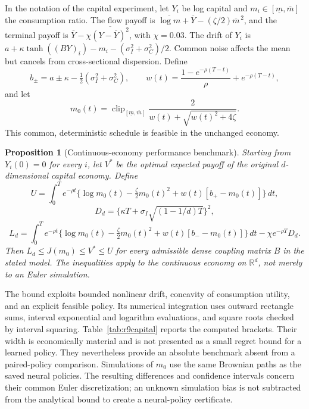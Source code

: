 \documentclass[ecta,nameyear,draft]{econsocart}
\newtheorem{proposition}[theorem]{Proposition}
\theoremstyle{definition}
\theoremstyle{remark}
\begin{document}
In the notation of the capital experiment, let $Y_i$ be log capital and $m_i\in[\underline m,\overline m]$ the consumption ratio. The flow payoff is $\overline{\log m}+\overline Y-(\zeta/2)\overline m^{\,2}$, and the terminal payoff is $\overline Y-\chi\overline{(Y-\overline Y)^2}$, with $\chi=0.03$. The drift of $Y_i$ is $a+\kappa\tanh((BY)_i)-m_i-(\sigma_I^2+\sigma_C^2)/2$. Common noise affects the mean but cancels from cross-sectional dispersion. Define
\[
 b_\pm=a\pm\kappa-\tfrac12(\sigma_I^2+\sigma_C^2),\qquad
 w(t)=\frac{1-e^{-\rho(T-t)}}{\rho}+e^{-\rho(T-t)},
\]
and let
\[
 m_0(t)=\operatorname{clip}_{[\underline m,\overline m]}
 \frac{2}{w(t)+\sqrt{w(t)^2+4\zeta}}.
\]
This common, deterministic schedule is feasible in the unchanged economy.

\begin{proposition}[Continuous-economy performance benchmark]\label{prop:r9capital}
Starting from $Y_i(0)=0$ for every $i$, let $V^*$ be the optimal expected payoff of the original $d$-dimensional capital economy. Define
\[
 U=\int_0^T e^{-\rho t}\{\log m_0(t)-\tfrac{\zeta}{2}m_0(t)^2+w(t)[b_+-m_0(t)]\}\,dt,
\]
\[
 D_d=\{\kappa T+\sigma_I\sqrt{(1-1/d)T}\}^{2},
\]
\[
 L_d=\int_0^T e^{-\rho t}\{\log m_0(t)-\tfrac{\zeta}{2}m_0(t)^2+w(t)[b_--m_0(t)]\}\,dt
 -\chi e^{-\rho T}D_d.
\]
Then $L_d\leq J(m_0)\leq V^*\leq U$ for every admissible dense coupling matrix $B$ in the stated model. The inequalities apply to the continuous economy on $\mathbb R^d$, not merely to an Euler simulation.
\end{proposition}

The bound exploits bounded nonlinear drift, concavity of consumption utility, and an explicit feasible policy. Its numerical integration uses outward rectangle sums, interval exponential and logarithm evaluations, and square roots checked by interval squaring. Table~\ref{tab:r9capital} reports the computed brackets. Their width is economically material and is not presented as a small regret bound for a learned policy. They nevertheless provide an absolute benchmark absent from a paired-policy comparison. Simulations of $m_0$ use the same Brownian paths as the saved neural policies. The resulting differences and confidence intervals concern their common Euler discretization; an unknown simulation bias is not subtracted from the analytical bound to create a neural-policy certificate.
\end{document}
